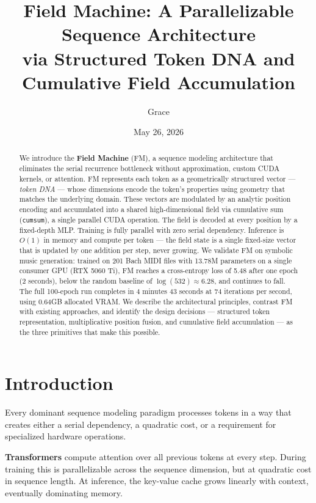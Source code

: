 \documentclass[11pt]{article}
\title{\textbf{Field Machine: A Parallelizable Sequence Architecture\\via Structured Token DNA and Cumulative Field Accumulation}}
\author{Grace}
\date{May 26, 2026}
\begin{document}
\maketitle

\begin{abstract}
We introduce the \textbf{Field Machine} (FM), a sequence modeling architecture that eliminates the serial recurrence bottleneck without approximation, custom CUDA kernels, or attention. FM represents each token as a geometrically structured vector — \textit{token DNA} — whose dimensions encode the token's properties using geometry that matches the underlying domain. These vectors are modulated by an analytic position encoding and accumulated into a shared high-dimensional field via cumulative sum (\texttt{cumsum}), a single parallel CUDA operation. The field is decoded at every position by a fixed-depth MLP. Training is fully parallel with zero serial dependency. Inference is $O(1)$ in memory and compute per token — the field state is a single fixed-size vector that is updated by one addition per step, never growing. We validate FM on symbolic music generation: trained on 201 Bach MIDI files with 13.78M parameters on a single consumer GPU (RTX 5060 Ti), FM reaches a cross-entropy loss of 5.48 after one epoch (2 seconds), below the random baseline of $\log(532) \approx 6.28$, and continues to fall. The full 100-epoch run completes in 4 minutes 43 seconds at 74 iterations per second, using 0.64GB allocated VRAM. We describe the architectural principles, contrast FM with existing approaches, and identify the design decisions — structured token representation, multiplicative position fusion, and cumulative field accumulation — as the three primitives that make this possible.
\end{abstract}

\section{Introduction}

Every dominant sequence modeling paradigm processes tokens in a way that creates either a serial dependency, a quadratic cost, or a requirement for specialized hardware operations.

\textbf{Transformers} \cite{vaswani2017attention} compute attention over all previous tokens at every step. During training this is parallelizable across the sequence dimension, but at quadratic cost in sequence length. At inference, the key-value cache grows linearly with context, eventually dominating memory.
\end{document}
